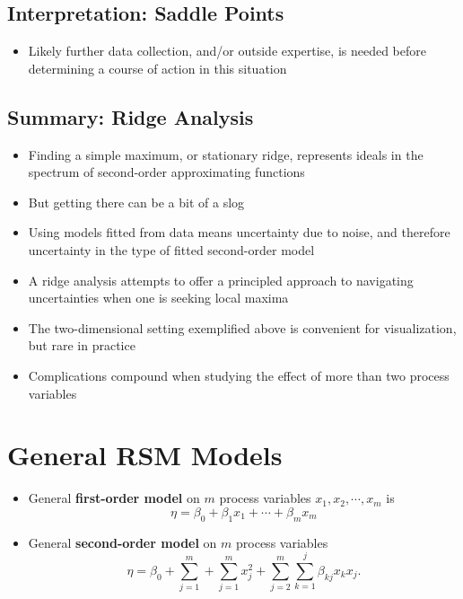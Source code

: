 \documentclass[
  letterpaper,
  DIV=11,
  numbers=noendperiod]{scrreprt}
\providecommand{\tightlist}{%
  \setlength{\itemsep}{0pt}\setlength{\parskip}{0pt}}\usepackage{longtable,booktabs,array}
\begin{document}
\subsection{Interpretation: Saddle
Points}\label{interpretation-saddle-points}

\begin{itemize}
\tightlist
\item
  Likely further data collection, and/or outside expertise, is needed
  before determining a course of action in this situation
\end{itemize}

\subsection{Summary: Ridge Analysis}\label{summary-ridge-analysis}

\begin{itemize}
\tightlist
\item
  Finding a simple maximum, or stationary ridge, represents ideals in
  the spectrum of second-order approximating functions
\item
  But getting there can be a bit of a slog
\item
  Using models fitted from data means uncertainty due to noise, and
  therefore uncertainty in the type of fitted second-order model
\item
  A ridge analysis attempts to offer a principled approach to navigating
  uncertainties when one is seeking local maxima
\item
  The two-dimensional setting exemplified above is convenient for
  visualization, but rare in practice
\item
  Complications compound when studying the effect of more than two
  process variables
\end{itemize}

\section{General RSM Models}\label{general-rsm-models}

\begin{itemize}
\tightlist
\item
  General \textbf{first-order model} on \(m\) process variables
  \(x_1, x_2, \cdots, x_m\) is
  \[\eta = \beta_0 + \beta_1x_1 + \cdots + \beta_m x_m\]
\item
  General \textbf{second-order model} on \(m\) process variables \[
  \eta= \beta_0 + \sum_{j=1}^m + \sum_{j=1}^m x_j^2 + \sum_{j=2}^m \sum_{k=1}^j \beta_{kj}x_k x_j.
  \]
\end{itemize}
\end{document}
